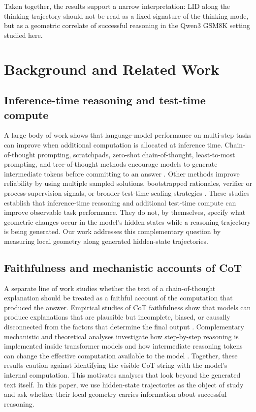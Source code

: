 \documentclass{article}
\theoremstyle{plain}
\theoremstyle{definition}
\theoremstyle{remark}
\begin{document}
Taken together, the results support a narrow interpretation: LID along the thinking trajectory should not be read as a fixed signature of the thinking mode, but as a geometric correlate of successful reasoning in the Qwen3 GSM8K setting studied here.

\section{Background and Related Work}

\subsection{Inference-time reasoning and test-time compute}
A large body of work shows that language-model performance on multi-step tasks can improve when additional computation is allocated at inference time. Chain-of-thought prompting, scratchpads, zero-shot chain-of-thought, least-to-most prompting, and tree-of-thought methods encourage models to generate intermediate tokens before committing to an answer \citep{wei2023chainofthoughtpromptingelicitsreasoning,nye2021show,kojima2022large,zhou2023least,yao2023tree}. Other methods improve reliability by using multiple sampled solutions, bootstrapped rationales, verifier or process-supervision signals, or broader test-time scaling strategies \citep{wang2023selfconsistencyimproveschainthought,zelikman2022star,lightman2023lets,zhang2025surveytesttimescalinglarge,snell2024scaling}. These studies establish that inference-time reasoning and additional test-time compute can improve observable task performance. They do not, by themselves, specify what geometric changes occur in the model's hidden states while a reasoning trajectory is being generated. Our work addresses this complementary question by measuring local geometry along generated hidden-state trajectories.

\subsection{Faithfulness and mechanistic accounts of CoT}
A separate line of work studies whether the text of a chain-of-thought explanation should be treated as a faithful account of the computation that produced the answer. Empirical studies of CoT faithfulness show that models can produce explanations that are plausible but incomplete, biased, or causally disconnected from the factors that determine the final output \citep{turpin2023language,lanham2023measuring}. Complementary mechanistic and theoretical analyses investigate how step-by-step reasoning is implemented inside transformer models and how intermediate reasoning tokens can change the effective computation available to the model \citep{dutta2024thinkstepbystepmechanisticunderstanding,merrill2023expressive}. Together, these results caution against identifying the visible CoT string with the model's internal computation. This motivates analyses that look beyond the generated text itself. In this paper, we use hidden-state trajectories as the object of study and ask whether their local geometry carries information about successful reasoning.
\end{document}
